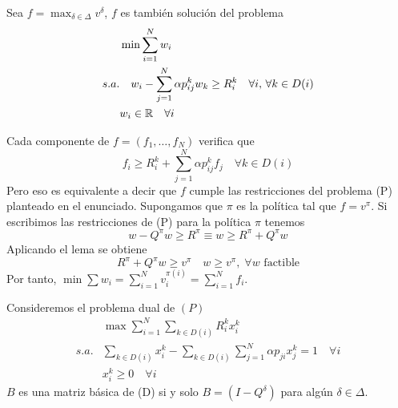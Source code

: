 \documentclass[MIOP.tex]{subfiles}
\begin{document}
\begin{teorema}
Sea $f=\max_{\delta \in \Delta}v^\delta$, $f$ es también solución del problema
\begin{align*}
&\min \sum_{i=1}^N w_i\\
s.a. &\quad w_i - \sum_{j=1}^N \alpha p_{ij}^k w_k \geq R^k_i\quad \forall i,\, \forall k\in D(i)\\
&w_i \in \mathbb{R} \quad \forall i
\end{align*}
\end{teorema}
\begin{dem}
Cada componente de $f=(f_1,\dotsc,f_N)$ verifica que 
$$
f_i \geq R_i^k + \sum_{j=1}^N \alpha p_{ij}^k f_j \quad \forall k\in D(i)$$
Pero eso es equivalente a decir que $f$ cumple las restricciones del problema (P) planteado en el enunciado. Supongamos que $\pi$ es la política tal que $f=v^\pi$. Si escribimos las restricciones de (P) para la política $\pi$ tenemos
$$
w-Q^\pi w \geq R^\pi \equiv w \geq R^\pi + Q^\pi w
$$
Aplicando el lema se obtiene
$$
R^\pi + Q^\pi w \geq v^\pi \quad w\geq v^\pi, \; \forall w \text{ factible}
$$
Por tanto, $\min \sum w_i = \sum_{i=1}^N v_i^{\pi(i)} = \sum_{i=1}^N f_i$.
\end{dem}
\begin{teorema}
Consideremos el problema dual de $(P)$
\begin{align*}
&\max \sum_{i=1}^N\sum_{k\in D(i)}R^k_i x_i^k\\
s.a. & \sum_{k\in D(i)} x_i^k - \sum_{k\in D(i)}\sum_{j=1}^N \alpha p_{ji} x_j^k = 1 \quad \forall i\\
&x_i^k \geq 0 \quad \forall i
\end{align*}
$B$ es una matriz básica de (D) si y solo $B=(I-Q^\delta)$ para algún $ \delta \in \Delta$.
\end{teorema}
\end{document}
